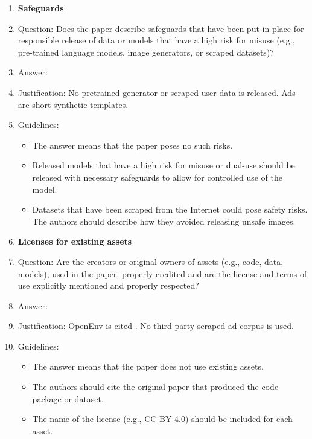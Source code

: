 \begin{enumerate}
\item {\bf Safeguards}
    \item[] Question: Does the paper describe safeguards that have been put in place for responsible release of data or models that have a high risk for misuse (e.g., pre-trained language models, image generators, or scraped datasets)?
    \item[] Answer: \answerNA{}
    \item[] Justification: No pretrained generator or scraped user data is released. Ads are short synthetic templates.
    \item[] Guidelines:
    \begin{itemize}
        \item The answer \answerNA{} means that the paper poses no such risks.
        \item Released models that have a high risk for misuse or dual-use should be released with necessary safeguards to allow for controlled use of the model.
        \item Datasets that have been scraped from the Internet could pose safety risks. The authors should describe how they avoided releasing unsafe images.
    \end{itemize}

\item {\bf Licenses for existing assets}
    \item[] Question: Are the creators or original owners of assets (e.g., code, data, models), used in the paper, properly credited and are the license and terms of use explicitly mentioned and properly respected?
    \item[] Answer: \answerYes{}
    \item[] Justification: OpenEnv is cited \citep{openenv2026}. No third-party scraped ad corpus is used.
    \item[] Guidelines:
    \begin{itemize}
        \item The answer \answerNA{} means that the paper does not use existing assets.
        \item The authors should cite the original paper that produced the code package or dataset.
        \item The name of the license (e.g., CC-BY 4.0) should be included for each asset.
    \end{itemize}


\end{enumerate}
